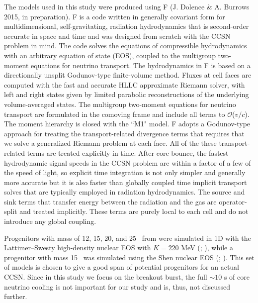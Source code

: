 
The models used in this study were produced using F{} (J. Dolence 
\& A. Burrows 2015, in preparation).
F{} is a code written in generally covariant form for 
multidimensional,
self-gravitating, radiation hydrodynamics that is second-order accurate in
space and time and was designed from scratch with the CCSN 
problem in mind. The code solves the equations of compressible
hydrodynamics with an arbitrary equation of state (EOS), coupled to the
multigroup two-moment equations for neutrino transport. The hydrodynamics
in F{} is based on a directionally unsplit Godunov-type finite-volume
method. Fluxes at cell faces are computed with the fast and accurate HLLC
approximate Riemann solver, with left and right states given by limited
parabolic reconstructions of the underlying volume-averaged states. The
multigroup two-moment equations for neutrino transport are formulated in
the comoving frame and include all terms to $\mathcal{O}$($v/c$). 
The moment hierarchy
is closed with the ``M1" model. F{} adopts a Godunov-type approach for
treating the transport-related divergence terms that requires that we
solve a generalized Riemann problem at each face. All of the these
transport-related terms are treated explicitly in time. After core bounce,
the fastest hydrodynamic signal speeds in the CCSN 
problem are within a factor of a few of the speed of light, so explicit
time integration is not only simpler and generally more accurate but it is
also faster than globally coupled time implicit transport solves that are
typically employed in radiation hydrodynamics. The source and sink terms
that transfer energy between the radiation and the gas are operator-split
and treated implicitly. These terms are purely local to each cell and do
not introduce any global coupling.

 Progenitors with mass of 12, 15, 20, and
25 \Msol\ from \cite{woosleyheger2007} 
were simulated in 1D with the Lattimer--Swesty high-density
nuclear EOS with $K=220$ MeV (\ls;
\citealt{lattimerswesty1991}), while a progenitor with mass 15
\Msol\ was simulated using the Shen nuclear EOS (\shen;
\citealp{shenetaljul1998,shenetalnov1998}).  This set of models is
chosen to give a good span of potential progenitors for an actual
CCSN. 
 Since in this study we focus on the breakout burst, the full ${\sim}10$ s of
core neutrino cooling is not important for our study and is, thus, not
discussed further.

